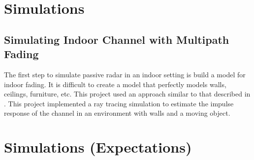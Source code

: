 \documentclass[article,11pt,onecolumn,final]{IEEEtran}
\begin{document}
\section{Simulations}
\subsection{Simulating Indoor Channel with Multipath Fading}
The first step to simulate passive radar in an indoor setting is build a model for indoor fading. It is difficult to create a model that perfectly models walls, ceilings, furniture, etc. This project used an approach similar to that described in \cite{Holt}. This project implemented a ray tracing simulation to estimate the impulse response of the channel in an environment with walls and a moving object. 

\section{Simulations (Expectations)} 
\end{document}
